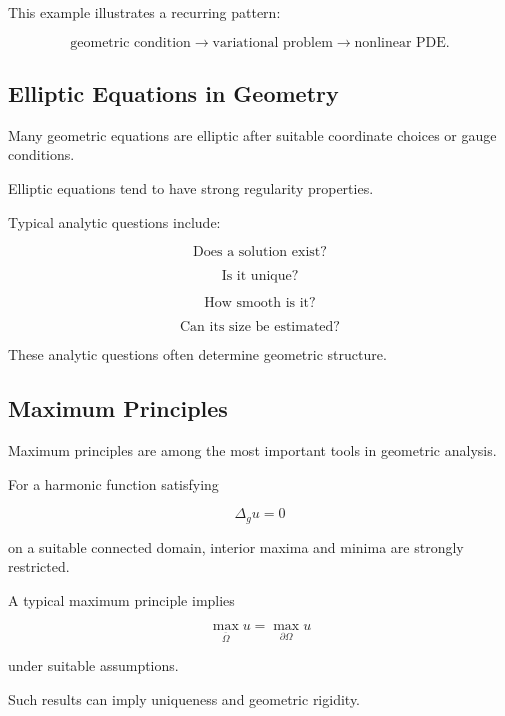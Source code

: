This example illustrates a recurring pattern:

\[
\boxed{
\text{geometric condition}
\longrightarrow
\text{variational problem}
\longrightarrow
\text{nonlinear PDE}.
}
\]

\subsection{Elliptic Equations in Geometry}
\label{subsec:elliptic-equations-geometry}

Many geometric equations are elliptic after suitable coordinate choices
or gauge conditions.

Elliptic equations tend to have strong regularity properties.

Typical analytic questions include:

\[
\boxed{
\text{Does a solution exist?}
}
\]

\[
\boxed{
\text{Is it unique?}
}
\]

\[
\boxed{
\text{How smooth is it?}
}
\]

\[
\boxed{
\text{Can its size be estimated?}
}
\]

These analytic questions often determine geometric structure.

\subsection{Maximum Principles}
\label{subsec:geometric-maximum-principles}

Maximum principles are among the most important tools in geometric
analysis.

For a harmonic function satisfying

\[
\Delta_g u=0
\]

on a suitable connected domain, interior maxima and minima are strongly
restricted.

A typical maximum principle implies

\[
\boxed{
\max_{\overline{\Omega}}u
=
\max_{\partial\Omega}u
}
\]

under suitable assumptions.

Such results can imply uniqueness and geometric rigidity.

